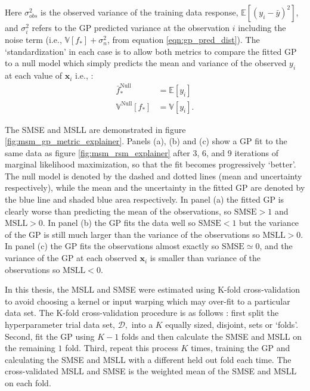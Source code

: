 Here $\sigma_{obs}^{2}$ is the observed variance of the training data response, $\mathbb{E}\left[(y_{i}-\bar{y})^{2}\right]$, and $\sigma_{i}^{2}$ refers to the GP predicted variance at the observation $i$ including the noise term (i.e., $\mathbb{V}\left[f_{*}\right]+\sigma_{n}^{2}$, from equation \ref{eqn:gp_pred_dist}).  The `standardization' in each case is to allow both metrics to compare the fitted GP to a null model which simply predicts the mean and variance of the observed $y_{i}$ at each value of $\mathbf{x}_{i}$ i.e., \cite{rasmussenGaussianProcessesMachine2006}:
\begin{equation}\label{eqn:gp_null}
\begin{aligned}
\bar{f}^{\mathrm{Null}}_{*} &= \mathbb{E}\left[y_{i}\right] \\
\mathbb{V}^{\mathrm{Null}}\left[f_{*}\right] &= \mathbb{V}\left[y_{i}\right].
\end{aligned}
\end{equation}

The SMSE and MSLL are demonstrated in figure \ref{fig:msm_gp_metric_explainer}. Panels (a), (b) and (c) show a GP fit to the same data as figure \ref{fig:msm_rsm_explainer} after 3, 6, and 9 iterations of marginal likelihood maximization, so that the fit becomes progressively `better'. The null model is denoted by the dashed and dotted lines (mean and uncertainty respectively), while the mean and the uncertainty in the fitted GP are denoted by the blue line and shaded blue area respectively.  In panel (a) the fitted GP is clearly worse than predicting the mean of the observations, so  $\mathrm{SMSE} > 1$ and  $\mathrm{MSLL} > 0$. In panel (b) the GP fits the data well so $\mathrm{SMSE} < 1$ but the variance of the GP is still much larger than the variance of the observations so $\mathrm{MSLL} > 0$. In panel (c) the GP fits the observations almost exactly so $\mathrm{SMSE} \simeq 0$, and the variance of the GP at each observed $\mathbf{x}_{i}$ is smaller than variance of the observations so $\mathrm{MSLL} < 0$. 

In this thesis, the MSLL and SMSE were estimated using K-fold cross-validation \cite{friedman2001elements} to avoid choosing a kernel or input warping which may over-fit to a particular data set. The K-fold cross-validation procedure is as follows \cite{friedman2001elements}: first split the hyperparameter trial data set, $\mathcal{D},$ into a $K$ equally sized, disjoint, sets or `folds'. Second, fit the GP using $K-1$ folds and then calculate the SMSE and MSLL on the remaining $1$ fold. Third, repeat this process $K$ times, training the GP and calculating the SMSE and MSLL with a different held out fold each time. The cross-validated MSLL and SMSE is the weighted mean of the SMSE and MSLL on each fold. 

